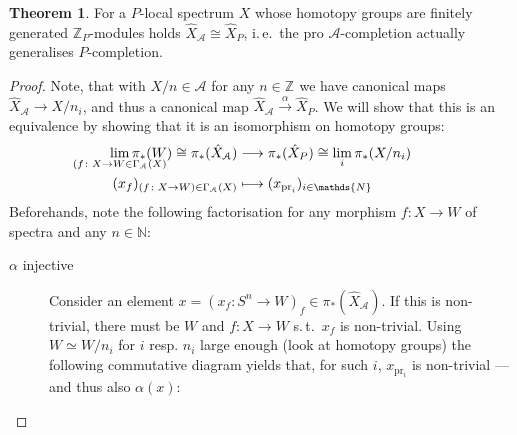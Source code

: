 \documentclass[english]{scrartcl}
\theoremstyle{definition}
\newtheorem*{Thm}{Theorem}
\theoremstyle{remark}
\newcommand*{\idest}{i.\,e.\ }
\newcommand*{\suchthat}{s.\,t.\ }
\newcommand*{\N}{\mathds{N}}
\newcommand*{\Z}[1][]{\mathds{Z}_{#1}}  %
\newcommand*{\longto}{\longrightarrow}
\newcommand*{\Sph}{S} %
\newcommand*{\Ps}{P}  %
\newcommand*{\pistar}[2][*]{\pi_{#1}(#2)}  %
\newcommand*{\compl}[2][\Ps]{\hat{#2}_{#1}}  %
\newcommand*{\A}{\mathcal{A}}  %
\begin{document}
\begin{Thm}
  For a $\Ps$-local spectrum $X$ whose homotopy groups are finitely
  generated $\Z[\Ps]$-modules holds $\compl[\A]{X}\cong\compl{X}$,
  \idest the pro $\A$-completion actually generalises $\Ps$-completion.
  \begin{proof}
    Note, that with $X/n\in\A$ for any $n\in\Z$ we have canonical
    maps $\compl[\A]X \to X/n_i$, and thus a canonical map
    $\compl[\A]X\xrightarrow{\alpha}\compl X$. We will show that this
    is an equivalence by showing that it is an isomorphism on homotopy
    groups:
    \begin{align*}
      \lim_{\mathclap{(f\colon X\to W\in\Gamma_\A(X)}}\pistar W \cong \pistar{\compl[\A]X}
      &\longto
        \pistar{\compl X} \cong \lim_i\pistar{X/n_i}
      \\
      (x_f)_{(f\colon X\to W)\in\Gamma_\A(X)}
      &\longmapsto
        (x_{\text{pr}_i})_{i\in\N}
    \end{align*}
    Beforehands, note the following factorisation for any morphism
    $f\colon X\to W$ of spectra and any $n\in\N$:
    \begin{center}
    \end{center}
    \begin{description}
    \item[$\alpha$ injective] Consider an element
      $x=(x_f\colon \Sph^n \to W)_f \in\pistar{\compl[\A]X}$.
      If this is non-trivial, there must be $W$ and $f\colon X\to W$
      \suchthat $x_f$ is non-trivial. Using $W\simeq W/n_i$ for
      $i$ resp. $n_i$ large enough (look at homotopy groups) the
      following commutative diagram yields that, for such $i$,
      $x_{\text{pr}_i}$ is non-trivial --- and thus also $\alpha(x)$:
      \begin{center}
\end{center}
\end{description}
\end{proof}
\end{Thm}
\end{document}

